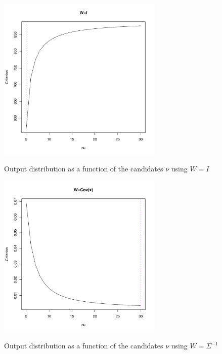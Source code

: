 \begin{figure}
    \centering
    \includegraphics[width=0.7\textwidth]{S&P500_returns_criterion_(W=I).pdf}
    \label{SP500_returns_criterion_I}
    \caption{Output distribution as a function of the candidates $\nu$ using $W=I$}
    \includegraphics[width=0.7\textwidth]{S&P500_returns_criterion_(W=Sigma^-1).pdf}
    \label{SP500_returns_criterion_W}
    \caption{Output distribution as a function of the candidates $\nu$ using $W=\Sigma^{-1}$}
\end{figure}

